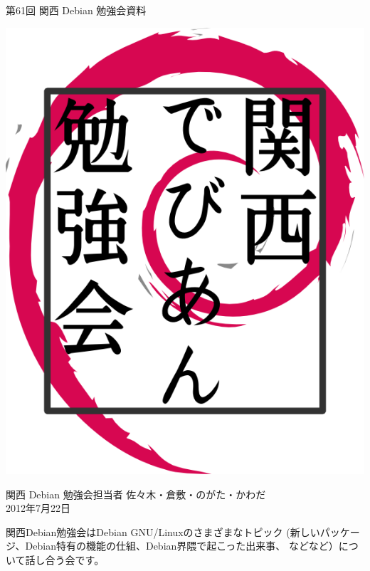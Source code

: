 \documentclass[mingoth,a4paper]{jsarticle}
\newcommand{\debmtgyear}{2012}
\newcommand{\debmtgdate}{22}
\newcommand{\debmtgmonth}{7}
\newcommand{\debmtgnumber}{61}
\begin{document}
\begin{titlepage}


 第\debmtgnumber{}回 関西 Debian 勉強会資料

\vspace{2cm}

\begin{center}
\includegraphics{image200802/kansaidebianlogo.png}
\end{center}

\begin{flushright}
\hfill{}関西 Debian 勉強会担当者 佐々木・倉敷・のがた・かわだ \\
\hfill{}\debmtgyear{}年\debmtgmonth{}月\debmtgdate{}日
\end{flushright}

\thispagestyle{empty}
\end{titlepage}


 関西Debian勉強会はDebian GNU/Linuxのさまざまなトピック
 (新しいパッケージ、Debian特有の機能の仕組、Debian界隈で起こった出来事、
 などなど）について話し合う会です。
\end{document}
